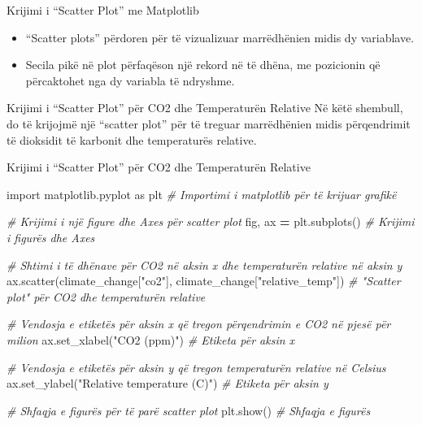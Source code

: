 \documentclass[
  ignorenonframetext,
]{beamer}
\newenvironment{Shaded}{\begin{snugshade}}{\end{snugshade}}
\newcommand{\CommentTok}[1]{\textcolor[rgb]{0.56,0.35,0.01}{\textit{#1}}}
\newcommand{\ImportTok}[1]{#1}
\newcommand{\NormalTok}[1]{#1}
\newcommand{\OperatorTok}[1]{\textcolor[rgb]{0.81,0.36,0.00}{\textbf{#1}}}
\newcommand{\StringTok}[1]{\textcolor[rgb]{0.31,0.60,0.02}{#1}}
\begin{document}
\begin{frame}{Krijimi i ``Scatter Plot'' me Matplotlib}
\protect\hypertarget{krijimi-i-scatter-plot-me-matplotlib}{}
\begin{itemize}
\item
  ``Scatter plots'' përdoren për të vizualizuar marrëdhënien midis dy
  variablave.
\item
  Secila pikë në plot përfaqëson një rekord në të dhëna, me pozicionin
  që përcaktohet nga dy variabla të ndryshme.
\end{itemize}
\end{frame}

\begin{frame}{Krijimi i ``Scatter Plot'' për CO2 dhe Temperaturën
Relative}
\protect\hypertarget{krijimi-i-scatter-plot-puxebr-co2-dhe-temperaturuxebn-relative}{}
Në këtë shembull, do të krijojmë një ``scatter plot'' për të treguar
marrëdhënien midis përqendrimit të dioksidit të karbonit dhe
temperaturës relative.
\end{frame}

\begin{frame}[fragile]{Krijimi i ``Scatter Plot'' për CO2 dhe
Temperaturën Relative}
\protect\hypertarget{krijimi-i-scatter-plot-puxebr-co2-dhe-temperaturuxebn-relative-1}{}

\begin{Shaded}
\begin{Highlighting}[]
\ImportTok{import}\NormalTok{ matplotlib.pyplot }\ImportTok{as}\NormalTok{ plt  }\CommentTok{\# Importimi i matplotlib për të krijuar grafikë}

\CommentTok{\# Krijimi i një figure dhe Axes për scatter plot}
\NormalTok{fig, ax }\OperatorTok{=}\NormalTok{ plt.subplots()  }\CommentTok{\# Krijimi i figurës dhe Axes}

\CommentTok{\# Shtimi i të dhënave për CO2 në aksin x dhe temperaturën relative në aksin y}
\NormalTok{ax.scatter(climate\_change[}\StringTok{"co2"}\NormalTok{], climate\_change[}\StringTok{"relative\_temp"}\NormalTok{])  }\CommentTok{\# "Scatter plot" për CO2 dhe temperaturën relative}

\CommentTok{\# Vendosja e etiketës për aksin x që tregon përqendrimin e CO2 në pjesë për milion}
\NormalTok{ax.set\_xlabel(}\StringTok{"CO2 (ppm)"}\NormalTok{)  }\CommentTok{\# Etiketa për aksin x}

\CommentTok{\# Vendosja e etiketës për aksin y që tregon temperaturën relative në Celsius}
\NormalTok{ax.set\_ylabel(}\StringTok{"Relative temperature (C)"}\NormalTok{)  }\CommentTok{\# Etiketa për aksin y}

\CommentTok{\# Shfaqja e figurës për të parë scatter plot}
\NormalTok{plt.show()  }\CommentTok{\# Shfaqja e figurës}
\end{Highlighting}
\end{Shaded}
\end{frame}
\end{document}
